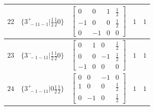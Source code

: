 \documentclass[fleqn,8pt]{jsarticle}
\begin{document}
\begin{longtable}{ccccc}
$ 22 $ & $ \{3^{+}_{\,\,-11-1}|\frac{1}{2} \frac{1}{2} 0\} $ & $ \begin{bmatrix} 0 & 0 & 1 & \frac{1}{2} \\ -1 & 0 & 0 & \frac{1}{2} \\ 0 & -1 & 0 & 0 \end{bmatrix} $ & $ 1 $ & $ 1 $ \\ \hline
$ 23 $ & $ \{3^{-}_{\,\,-1-11}|\frac{1}{2} \frac{1}{2} 0\} $ & $ \begin{bmatrix} 0 & 1 & 0 & \frac{1}{2} \\ 0 & 0 & -1 & \frac{1}{2} \\ -1 & 0 & 0 & 0 \end{bmatrix} $ & $ 1 $ & $ 1 $ \\ \hline
$ 24 $ & $ \{3^{+}_{\,\,-1-11}|0 \frac{1}{2} \frac{1}{2}\} $ & $ \begin{bmatrix} 0 & 0 & -1 & 0 \\ 1 & 0 & 0 & \frac{1}{2} \\ 0 & -1 & 0 & \frac{1}{2} \end{bmatrix} $ & $ 1 $ & $ 1 $ \\
\end{longtable}
\end{document}
